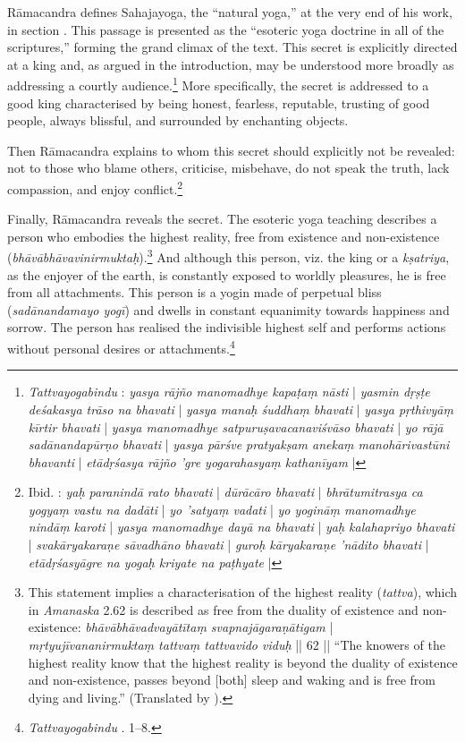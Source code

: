 Rāmacandra defines Sahajayoga, the ``natural yoga,'' at the very end of his work, in section . This passage is presented as the ``esoteric yoga doctrine in all of the scriptures,'' forming the grand climax of the text. This secret is explicitly directed at a king and, as argued in the introduction, may be understood more broadly as addressing a courtly audience.\footnote{\emph{Tattvayogabindu} : \textit{yasya rājño manomadhye kapaṭaṃ nāsti} | \textit{yasmin dṛṣṭe deśakasya trāso na bhavati} | \textit{yasya manaḥ śuddhaṃ bhavati} | \textit{yasya pṛthivyāṃ kīrtir bhavati} | \textit{yasya manomadhye satpuruṣavacanaviśvāso bhavati} | \textit{yo rājā sadānandapūrṇo bhavati} | \textit{yasya pārśve pratyakṣam anekaṃ manohārivastūni bhavanti} | \textit{etādṛśasya rājño 'gre yogarahasyaṃ kathanīyam} |} More specifically, the secret is addressed to a good king characterised by being honest, fearless, reputable, trusting of good people, always blissful, and surrounded by enchanting objects.

Then Rāmacandra explains to whom this secret should explicitly not be revealed: not to those who blame others, criticise, misbehave, do not speak the truth, lack compassion, and enjoy conflict.\footnote{Ibid. : \textit{yaḥ paranindā rato bhavati} | \textit{dūrācāro bhavati} | \textit{bhrātumitrasya ca yogyaṃ vastu na dadāti} | \textit{yo 'satyaṃ vadati} | \textit{yo yogināṃ manomadhye nindāṃ karoti} | \textit{yasya manomadhye dayā na bhavati} | \textit{yaḥ kalahapriyo bhavati} | \textit{svakāryakaraṇe sāvadhāno bhavati} | \textit{guroḥ kāryakaraṇe 'nādito bhavati} | \textit{etādṛśasyāgre na yogaḥ kriyate na paṭhyate} |}

Finally, Rāmacandra reveals the secret. The esoteric yoga teaching describes a person who embodies the highest reality, free from existence and non-existence (\textit{bhāvābhāvavinirmuktaḥ}).\footnote{This statement implies a characterisation of the highest reality (\textit{tattva}), which in \emph{Amanaska} 2.62 is described as free from the duality of existence and non-existence: \textit{bhāvābhāvadvayātītaṃ svapnajāgaraṇātigam} | \textit{mṛtyujīvananirmuktaṃ tattvaṃ tattvavido viduḥ} || 62 || ``The knowers of the highest reality know that the highest reality is beyond the duality of existence and non-existence, passes beyond [both] sleep and waking and is free from dying and living.'' (Translated by \citeauthor[2013: 318]{birch2013}).} And although this person, viz. the king or a \textit{kṣatriya}, as the enjoyer of the earth, is constantly exposed to worldly pleasures, he is free from all attachments. This person is a yogin made of perpetual bliss (\textit{sadānandamayo yogī}) and dwells in constant equanimity towards happiness and sorrow. The person has realised the indivisible highest self and performs actions without personal desires or attachments.\footnote{\emph{Tattvayogabindu} . 1–8.}

